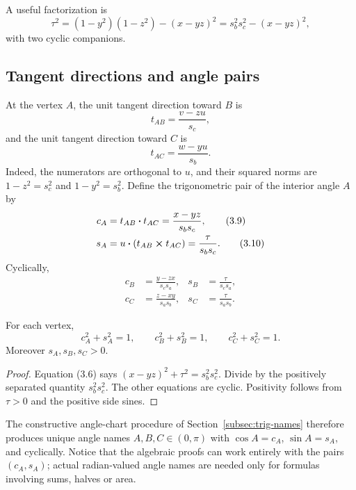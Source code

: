 A useful factorization is
\begin{equation}
 \tau^2=(1-y^2)(1-z^2)-(x-yz)^2
       =s_b^2s_c^2-(x-yz)^2,                               \tag{3.6}
\end{equation}
with two cyclic companions.

\subsection{Tangent directions and angle pairs}

At the vertex \(A\), the unit tangent direction toward \(B\) is
\begin{equation}
 t_{AB}=\frac{v-zu}{s_c},                                   \tag{3.7}
\end{equation}
and the unit tangent direction toward \(C\) is
\begin{equation}
 t_{AC}=\frac{w-yu}{s_b}.                                   \tag{3.8}
\end{equation}
Indeed, the numerators are orthogonal to \(u\), and their squared norms are
\(1-z^2=s_c^2\) and \(1-y^2=s_b^2\).  Define the trigonometric pair of the
interior angle \(A\) by
\begin{align}
 c_A&=t_{AB}\mathbin{\boldsymbol{\cdot}} t_{AC}
     =\frac{x-yz}{s_bs_c},                                  \tag{3.9}\\
 s_A&=u\mathbin{\boldsymbol{\cdot}}(t_{AB}\mathbin{\boldsymbol{\times}} t_{AC})
     =\frac{\tau}{s_bs_c}.                                  \tag{3.10}
\end{align}
Cyclically,
\begin{align}
 c_B&=\frac{y-zx}{s_cs_a},&s_B&=\frac{\tau}{s_cs_a},        \tag{3.11}\\
 c_C&=\frac{z-xy}{s_as_b},&s_C&=\frac{\tau}{s_as_b}.        \tag{3.12}
\end{align}

\begin{lemma}
\label{lem:angle-unit}
For each vertex,
\[
 c_A^2+s_A^2=1,
 \qquad c_B^2+s_B^2=1,
 \qquad c_C^2+s_C^2=1.
\]
Moreover \(s_A,s_B,s_C>0\).
\end{lemma}

\begin{proof}
Equation (3.6) says
\((x-yz)^2+\tau^2=s_b^2s_c^2\).  Divide by the positively separated
quantity \(s_b^2s_c^2\).  The other equations are cyclic.  Positivity follows
from \(\tau>0\) and the positive side sines.
\end{proof}

The constructive angle-chart procedure of Section~\ref{subsec:trig-names}
therefore produces unique angle names \(A,B,C\in(0,\pi)\) with
\(\cos A=c_A\), \(\sin A=s_A\), and cyclically.  Notice that the algebraic
proofs can work entirely with the pairs \((c_A,s_A)\); actual radian-valued
angle names are needed only for formulas involving sums, halves or area.

